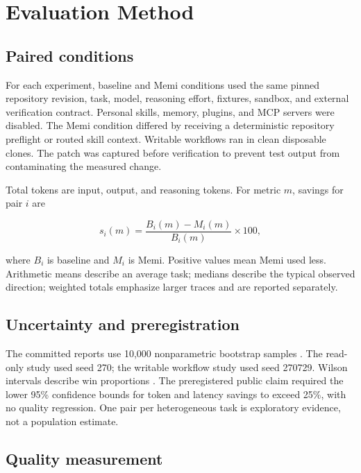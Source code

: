 \documentclass[10pt,twocolumn]{article}
\begin{document}
\section{Evaluation Method}

\subsection{Paired conditions}

For each experiment, baseline and Memi conditions used the same pinned
repository revision, task, model, reasoning effort, fixtures, sandbox, and
external verification contract. Personal skills, memory, plugins, and MCP
servers were disabled. The Memi condition differed by receiving a deterministic
repository preflight or routed skill context. Writable workflows ran in clean
disposable clones. The patch was captured before verification to prevent test
output from contaminating the measured change.

Total tokens are input, output, and reasoning tokens. For metric $m$, savings
for pair $i$ are

\begin{equation}
s_i(m)=\frac{B_i(m)-M_i(m)}{B_i(m)}\times 100,
\end{equation}

where $B_i$ is baseline and $M_i$ is Memi. Positive values mean Memi used less.
Arithmetic means describe an average task; medians describe the typical
observed direction; weighted totals emphasize larger traces and are reported
separately.

\subsection{Uncertainty and preregistration}

The committed reports use 10,000 nonparametric bootstrap samples
\cite{efron1994bootstrap}. The read-only study used seed 270; the writable
workflow study used seed 270729. Wilson intervals describe win proportions
\cite{wilson1927probable}. The preregistered public claim required the lower
95\% confidence bounds for token and latency savings to exceed 25\%, with no
quality regression. One pair per heterogeneous task is exploratory evidence,
not a population estimate.

\subsection{Quality measurement}
\end{document}
